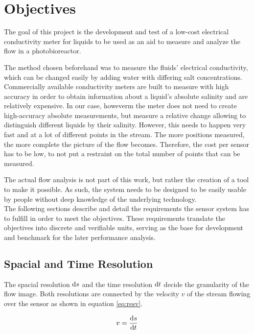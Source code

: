 \chapter{Objectives} \label{obj}

The goal of this project is the development and test of a low-cost electrical conductivity meter for liquids to be used as an aid to measure and analyze the flow in a photobioreactor.

The method chosen beforehand was to measure the fluids' electrical conductivity, which can be changed easily by adding water with differing salt concentrations. Commercially available conductivity meters are built to measure with high accuracy in order to obtain information about a liquid's absolute salinity and are relatively expensive. In our case, howeverm the meter does not need to create high-accuracy absolute measurements, but measure a relative change allowing to distinguish different liquids by their salinity. However, this needs to happen very fast and at a lot of different points in the stream. The more positions measured, the more complete the picture of the flow becomes. Therefore, the cost per sensor has to be low, to not put a restraint on the total number of points that can be measured.

The actual flow analysis is not part of this work, but rather the creation of a tool to make it possible. As such, the system needs to be designed to be easily usable by people without deep knowledge of the underlying technology.\\

The following sections describe and detail the requirements the sensor system has to fulfill in order to meet the objectives. These requirements translate the objectives into discrete and verifiable units, serving as the base for development and benchmark for the later performance analysis. 

\section{Spacial and Time Resolution}

The spacial resolution $ \mathop{}\!\mathrm{d} s $ and the time resolution $ \mathop{}\!\mathrm{d} t $ decide the granularity of the flow image. Both resolutions are connected by the velocity $ v $ of the stream flowing over the sensor as shown in equation \eqref{eq:resv}.

\begin{equation}
	v = \dfrac{\mathop{}\!\mathrm{d} s}{\mathop{}\!\mathrm{d} t}
\label{eq:resv} 
\end{equation}


